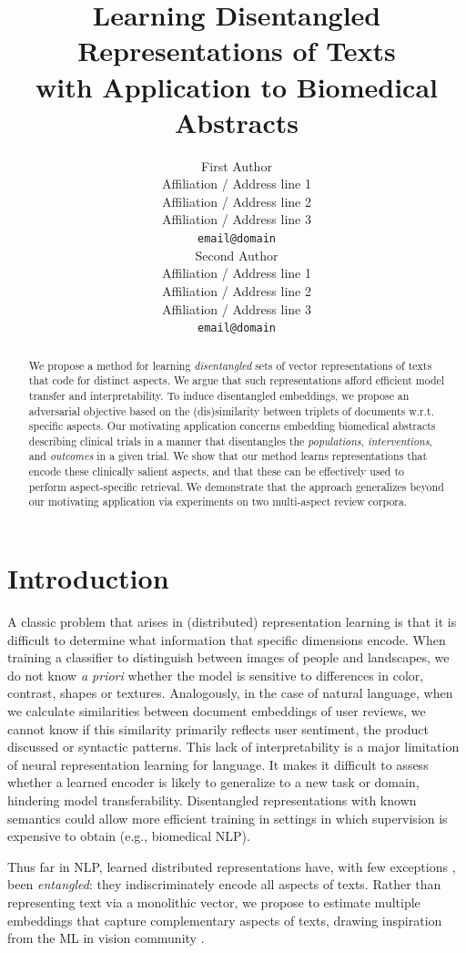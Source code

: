 \documentclass[11pt,a4paper]{article}
\title{Learning Disentangled Representations of Texts \\ with Application to Biomedical Abstracts}
\author{First Author \\
  Affiliation / Address line 1 \\
  Affiliation / Address line 2 \\
  Affiliation / Address line 3 \\
  {\tt email@domain} \\\And
  Second Author \\
  Affiliation / Address line 1 \\
  Affiliation / Address line 2 \\
  Affiliation / Address line 3 \\
  {\tt email@domain} \\}
\date{}
\begin{document}
\maketitle
\begin{abstract}

We propose a method for learning \emph{disentangled} sets of vector representations of texts that code for distinct aspects. We argue that such representations afford efficient model transfer and interpretability. To induce disentangled embeddings, we propose an adversarial objective based on the (dis)similarity between triplets of documents w.r.t. specific aspects. Our motivating application concerns embedding biomedical abstracts describing clinical trials in a manner that disentangles the \emph{populations}, \emph{interventions}, and \emph{outcomes} in a given trial. We show that our method learns representations that encode these clinically salient aspects, and that these can be effectively used to perform aspect-specific retrieval. We demonstrate that the approach generalizes beyond our motivating application via experiments on two multi-aspect review corpora. 
\end{abstract}

\section{Introduction}
\vspace{-.5em}

A classic problem that arises in (distributed) representation learning is that it is difficult to determine what information that specific dimensions encode. When training a classifier to distinguish between images of people and landscapes, we do not know \emph{a priori} whether the model is sensitive to differences in color, contrast, shapes or textures. Analogously, in the case of natural language, when we calculate similarities between document embeddings of user reviews, we cannot know if this similarity primarily reflects user sentiment, the product discussed or syntactic patterns. This lack of interpretability is a major limitation of neural representation learning for language. It makes it difficult to assess whether a learned encoder is likely to generalize to a new task or domain, hindering model transferability. Disentangled representations with known semantics could allow more efficient training in settings in which supervision is expensive to obtain (e.g., biomedical NLP).

Thus far in NLP, learned distributed representations have, with few exceptions \cite{ruder2016hierarchical,he-2017,zhang2017aspect}, been \emph{entangled}: they indiscriminately encode all aspects of texts. 
Rather than representing text via a monolithic vector, we propose to estimate multiple embeddings that capture complementary aspects of texts, drawing inspiration from the ML in vision community \cite{whitney2016disentangled,veit2017conditional}.
\end{document}
